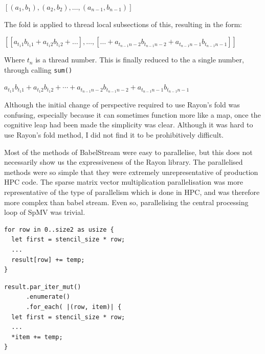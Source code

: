 \begin{center}
$[(a_1, b_1), (a_2, b_2), \ldots, (a_{n-1}, b_{n-1})]$
\end{center}

The fold is applied to thread local subsections of this, resulting in the form:

\begin{center}
$[ [a_{t_{1}1} b_{t_{1}1} + a_{t_{1}2}b_{t_{1}2} + \ldots ], \ldots ,[\ldots + a_{t_{n-1}{n-2}} b_{t_{n-1}{n-2}} + a_{t_{n-1}{n-1}} b_{t_{n-1}{n-1}}] ]$ 
\end{center}
Where $t_n$ is a thread number. This is finally reduced to the a single number, through calling \texttt{sum()}

\begin{center}
$a_{t_{1}1} b_{t_{1}1} + a_{t_{1}2}b_{t_{1}2} + \cdots + a_{t_{n-1}{n-2}} b_{t_{n-1}{n-2}} + a_{t_{n-1}{n-1}} b_{t_{n-1}{n-1}}$ 
\end{center}

Although the initial change of perspective required to use Rayon's fold was confusing, especially because it can sometimes function more like a map, once the cognitive leap had been made the simplicity was clear. Although it was hard to use Rayon's fold method, I did not find it to be prohibitively difficult.

Most of the methods of BabelStream were easy to parallelise, but this does not necessarily show us the expressiveness of the Rayon library. The parallelised methods were so simple that they were extremely unrepresentative of production HPC code. The sparse matrix vector multiplication parallelisation was more representative of the type of parallelism which is done in HPC, and was therefore more complex than babel stream. Even so, parallelising the central processing loop of SpMV was trivial.
\noindent\begin{minipage}{.49\textwidth}
\begin{code}
\begin{verbatim}
for row in 0..size2 as usize {
  let first = stencil_size * row;
  ...
  result[row] += temp;
}
\end{verbatim}
\end{code}
\end{minipage}\hfill
\begin{minipage}{.49\textwidth}
\begin{code}
\begin{verbatim}
result.par_iter_mut()
      .enumerate()
      .for_each( |(row, item)| {
  let first = stencil_size * row;
  ...
  *item += temp;
}
\end{verbatim}
\label{lst:spmv-par}
\end{code}
\end{minipage}

